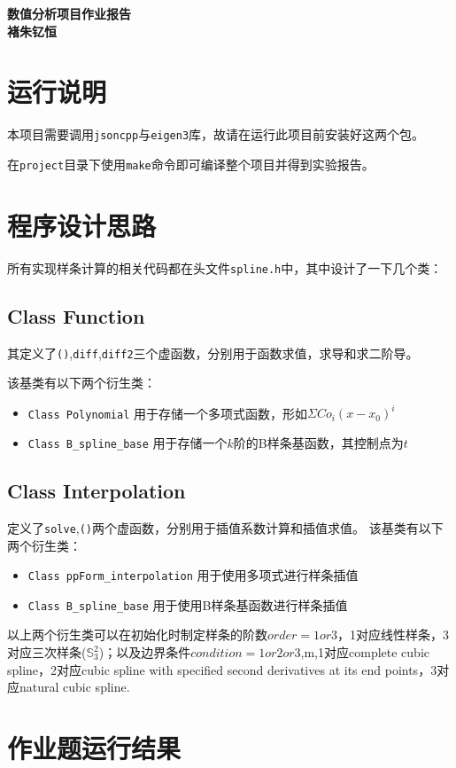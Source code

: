 \documentclass[12]{article}%
\begin{document}
\begin{center}
    \LARGE\songti\textbf{数值分析项目作业报告} \\%
    \large\kaishu\textbf{褚朱钇恒}%
\end{center}
\section{运行说明}
    本项目需要调用\verb|jsoncpp|与\verb|eigen3|库，故请在运行此项目前安装好这两个包。

    在\verb|project|目录下使用\verb|make|命令即可编译整个项目并得到实验报告。

\section{程序设计思路}
所有实现样条计算的相关代码都在头文件\verb|spline.h|中，其中设计了一下几个类：
\subsection{Class Function}
其定义了\verb|()|,\verb|diff|,\verb|diff2|三个虚函数，分别用于函数求值，求导和求二阶导。

该基类有以下两个衍生类：
\begin{itemize}
    \item \verb|Class Polynomial| 用于存储一个多项式函数，形如$\Sigma Co_i(x-x_0)^i$
    \item \verb|Class B_spline_base| 用于存储一个$k$阶的B样条基函数，其控制点为$t$
\end{itemize}
\subsection{Class Interpolation}
定义了\verb|solve|,\verb|()|两个虚函数，分别用于插值系数计算和插值求值。
该基类有以下两个衍生类：
\begin{itemize}
    \item \verb|Class ppForm_interpolation| 用于使用多项式进行样条插值
    \item \verb|Class B_spline_base| 用于使用B样条基函数进行样条插值
\end{itemize}
以上两个衍生类可以在初始化时制定样条的阶数$order=1 or 3$，1对应线性样条，3对应三次样条($\mathbb{S}_3^2$)；以及边界条件$condition=1 or 2 or 3$,m,1对应complete cubic spline，2对应cubic spline with specified second derivatives at its
end points，3对应natural cubic spline.

\section{作业题运行结果}
\end{document}
